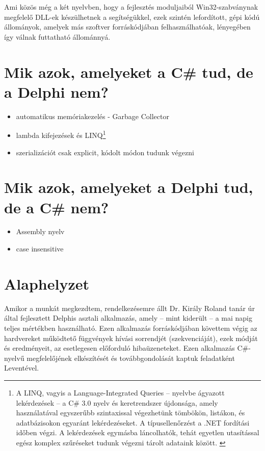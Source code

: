 \documentclass[tocnopagenum]{thesis-ekf}
\theoremstyle{definition}
\theoremstyle{remark}
\begin{document}
	Ami közös még a két nyelvben, hogy a fejlesztés moduljaiból Win32-szabványnak megfelelő DLL-ek készülhetnek a segítségükkel, ezek szintén lefordított, gépi kódú állományok, amelyek más szoftver forráskódjában felhasználhatóak, lényegében így válnak futtatható állománnyá.
	
	\section{Mik azok, amelyeket a C\# tud, de a Delphi nem?}
	\begin{itemize}
		\item automatikus memóriakezelés - Garbage Collector
		\item lambda kifejezések és LINQ\footnote{A LINQ, vagyis a Language-Integrated Queries -- nyelvbe ágyazott lekérdezések -- a C\# 3.0 nyelv és keretrendszer újdonsága, amely használatával egyszerűbb szintaxissal végezhetünk tömbökön, listákon, és adatbázisokon egyaránt lekérdezéseket. A típusellenőrzést a .NET fordítási időben végzi. A lekérdezések egymásba láncolhatók, tehát egyetlen utasítással egész komplex szűréseket tudunk végezni tárolt adataink között. \cite{linq}}
		\item szerializációt csak explicit, kódolt módon tudunk végezni
	\end{itemize}
	\section{Mik azok, amelyeket a Delphi tud, de a C\# nem?}
	\begin{itemize}
		\item Assembly nyelv
		\item case insensitive
	\end{itemize}\cite{pascal_csharp}
	\section{Alaphelyzet}
	Amikor a munkát megkezdtem, rendelkezésemre állt Dr. Király Roland tanár úr által fejlesztett Delphis asztali alkalmazás, amely -- mint kiderült -- a mai napig teljes mértékben használható. Ezen alkalmazás forráskódjában követtem végig az hardvereket működtető függvények hívási sorrendjét (szekvenciáját), ezek módját és eredményeit, az esetlegesen előforduló hibaüzeneteket. 
	Ezen alkalmazás C\#-nyelvű megfelelőjének elkészítését és továbbgondolását kaptuk feladatként Leventével.
\end{document}
